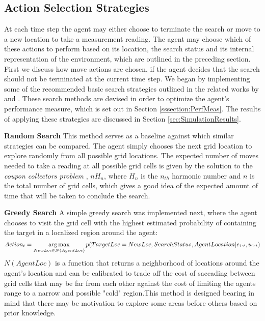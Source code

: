\subsection{Action Selection Strategies}\label{subsubsec:ActionSelection}
At each time step the agent may either choose to terminate the search or move to a new location to take a measurement reading. The agent may choose which of these actions to perform based on its location, the search status and its internal representation of the environment, which are outlined in the preceding section. First we discuss how move actions are chosen, if the agent decides that the search should not be terminated at the current time step. We began by implementing some of the recommended basic search strategies outlined in the related works by \citeauthor{Chung2007ASearchb} \cite{Chung2007ASearchb} and \citeauthor{Waharte2010SupportingUAVsb} \cite{Waharte2010SupportingUAVsb}. These search methods are devised in order to optimize the agent's performance measure, which is set out in Section \ref{sssection:PerfMeas}. The results of applying these strategies are discussed in Section \ref{sec:SimulationResults}.\par 
{}
\textbf{Random Search}
This method serves as a baseline against which similar strategies can be compared. The agent simply chooses the next grid location to explore randomly from all possible grid locations. The expected number of moves needed to take a reading at all possible grid cells is given by the solution to the \textit{coupon collectors problem} \cite{Erdos1961OnTheory}, $nH_n$, where $H_n$ is the $n_{th}$ harmonic number and $n$ is the total number of grid cells, which gives a good idea of the expected amount of time that will be taken to conclude the search.

\textbf{Greedy Search}
A simple greedy search was implemented next, where the agent chooses to visit the grid cell with the highest estimated probability of containing the target in a localized region around the agent:
\footnotesize
\[
Action_t = \operatorname*{arg\,max}_{NewLoc \in N(AgentLoc)}{p(TargetLoc = NewLoc, SearchStatus, AgentLocation| e_{1:t}, u_{1:t})}
\]
\normalsize
$N(AgentLoc)$ is a function that returns a neighborhood of locations around the agent's location and can be calibrated to trade off the cost of saccading between grid cells that may be far from each other against the cost of limiting the agents range to a narrow and possible "cold" region.This method is designed bearing in mind that there may be motivation to explore some areas before others based on prior knowledge. 

